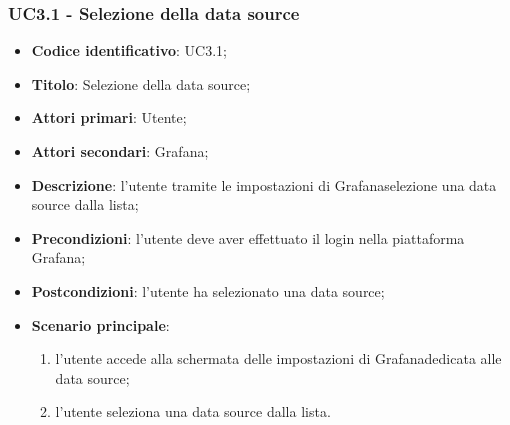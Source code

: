     \subsubsection{UC3.1 - Selezione della data source}
        \begin{itemize}
            \item \textbf{Codice identificativo}: UC3.1;
            \item \textbf{Titolo}: Selezione della data source;
            \item \textbf{Attori primari}: Utente;
            \item \textbf{Attori secondari}: Grafana\glo;
            \item \textbf{Descrizione}: l'utente tramite le impostazioni di Grafana\glosp selezione una data source dalla lista;
            \item \textbf{Precondizioni}: l'utente deve aver effettuato il login nella piattaforma Grafana\glo;
            \item \textbf{Postcondizioni}: l'utente ha selezionato una data source;
            \item \textbf{Scenario principale}:
            \begin{enumerate}
                \item l'utente accede alla schermata delle impostazioni di Grafana\glosp dedicata alle data source;
                \item l'utente seleziona una data source dalla lista.
            \end{enumerate}
        \end{itemize}
